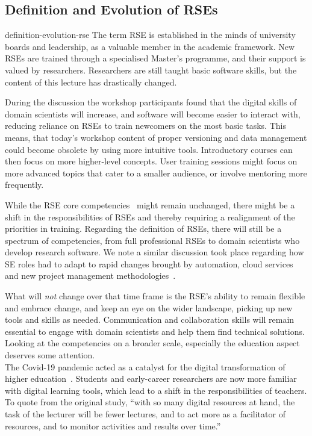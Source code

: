 \documentclass{eceasst}
\begin{document}
\subsection{Definition and Evolution of RSEs}
\begin{whatis}{}{definition-evolution-rse}
The term RSE is established in the minds of university boards and leadership, as a valuable member in the academic framework.
New RSEs are trained through a specialised Master's programme, and their support is valued by researchers.
Researchers are still taught basic software skills, but the content of this lecture has drastically changed.
\end{whatis}
During the discussion the workshop participants found that
the digital skills of domain scientists will increase,
and software will become easier to interact with,
reducing reliance on RSEs to train newcomers on the most basic tasks.
This means, that today's workshop content of proper versioning
and data management could become obsolete by using more intuitive tools.
Introductory courses can then focus on more higher-level concepts.
User training sessions might focus on more advanced topics
that cater to a smaller audience, or involve mentoring more frequently.

While the RSE core competencies~\cite{Goth2024} might remain unchanged,
there might be a shift in the responsibilities of RSEs and thereby requiring a realignment of the priorities in training.
Regarding the definition of RSEs, there will still be a spectrum of competencies,
from full professional RSEs to domain scientists who develop research software.
We note a similar discussion took place regarding how SE roles had to adapt to
rapid changes brought by automation, cloud services and new project management
methodologies~\cite{Meade2019}.

What will \emph{not} change over that time frame is the RSE's ability to remain
flexible and embrace change, and keep an eye on the wider landscape,
picking up new tools and skills as needed.
Communication and collaboration skills will remain essential to engage
with domain scientists and help them find technical solutions.\\

Looking at the competencies on a broader scale, especially the education aspect deserves some attention.\\
The Covid-19 pandemic acted as a catalyst for the digital transformation
of higher education~\cite{Bygstad2022}. Students and early-career researchers
are now more familiar with digital learning tools, which lead to a shift
in the responsibilities of teachers. To quote from the original study,
``with so many digital resources at hand,
the task of the lecturer will be fewer lectures,
and to act more as a facilitator of resources,
and to monitor activities and results over time.''~\cite{Bygstad2022}
\end{document}
